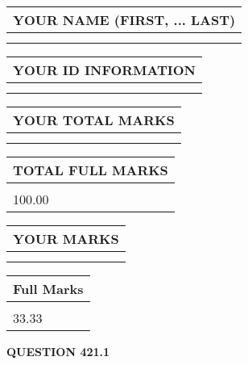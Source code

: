 \documentclass{ctexart}
\begin{document}
   
   
   
\newpage 
\setcounter{page}{ 
   421001 } 
   
   
   
   
\noindent\begin{tabular}{|l|}
\hline
YOUR NAME (FIRST, ... LAST)  \\
\hline
 \\ 
 \\ 
\hline
\end{tabular}
\hspace{0.05in} \begin{tabular}{|l|}
\hline
 YOUR   ID   INFORMATION  \\
\hline
 \\ 
 \\ 
\hline
\end{tabular}
   
   
\vspace{0.2in}\noindent\begin{tabular}{|l|}
\hline
YOUR TOTAL MARKS  \\
\hline
 \\ 
 \\ 
\hline
\end{tabular}
\hspace{0.05in} \begin{tabular}{|l|}
\hline
TOTAL FULL MARKS  \\
\hline
 \\ 
100.00 \\
\hline
\end{tabular}
   
   
 \vspace{0.2in}
 
 
 
 
   
   
  
\vspace{0.2in}
  
\noindent\begin{tabular}{|l|}
\hline
 YOUR MARKS  \\
\hline
 \\ 
 \\ 
\hline
\end{tabular}
\hspace{0.05in} \begin{tabular}{|l|}
\hline
 Full Marks  \\
\hline
 \\ 
33.33 \\
\hline
\end{tabular}
{\textbf{\Large{QUESTION
421.1 
}}}
  
\end{document}

